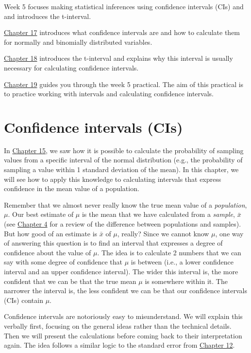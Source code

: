 \documentclass[
]{scrbook}
\begin{document}
Week 5 focuses making statistical inferences using confidence intervals (CIs) and and introduces the t-interval.

\protect\hyperlink{Chapter_17}{Chapter 17} introduces what confidence intervals are and how to calculate them for normally and binomially distributed variables.

\protect\hyperlink{Chapter_18}{Chapter 18} introduces the t-interval and explains why this interval is usually necessary for calculating confidence intervals.

\protect\hyperlink{Chapter_19}{Chapter 19} guides you through the week 5 practical.
The aim of this practical is to practice working with intervals and calculating confidence intervals.

\hypertarget{Chapter_17}{%
\chapter{Confidence intervals (CIs)}\label{Chapter_17}}

In \protect\hyperlink{Chapter_15}{Chapter 15}, we saw how it is possible to calculate the probability of sampling values from a specific interval of the normal distribution (e.g., the probability of sampling a value within 1 standard deviation of the mean).
In this chapter, we will see how to apply this knowledge to calculating intervals that express confidence in the mean value of a population.

Remember that we almost never really know the true mean value of a \emph{population}, \(\mu\).
Our best estimate of \(\mu\) is the mean that we have calculated from a \emph{sample}, \(\bar{x}\) (see \protect\hyperlink{Chapter_4}{Chapter 4} for a review of the difference between populations and samples).
But how good of an estimate is \(\bar{x}\) of \(\mu\), really?
Since we cannot know \(\mu\), one way of answering this question is to find an interval that expresses a degree of confidence about the value of \(\mu\).
The idea is to calculate 2 numbers that we can say with some degree of confidence that \(\mu\) is between (i.e., a lower confidence interval and an upper confidence interval).
The wider this interval is, the more confident that we can be that the true mean \(\mu\) is somewhere within it.
The narrower the interval is, the less confident we can be that our confidence intervals (CIs) contain \(\mu\).

Confidence intervals are notoriously easy to misunderstand.
We will explain this verbally first, focusing on the general ideas rather than the technical details.
Then we will present the calculations before coming back to their interpretation again.
The idea follows a similar logic to the standard error from \protect\hyperlink{Chapter_12}{Chapter 12}.
\end{document}
